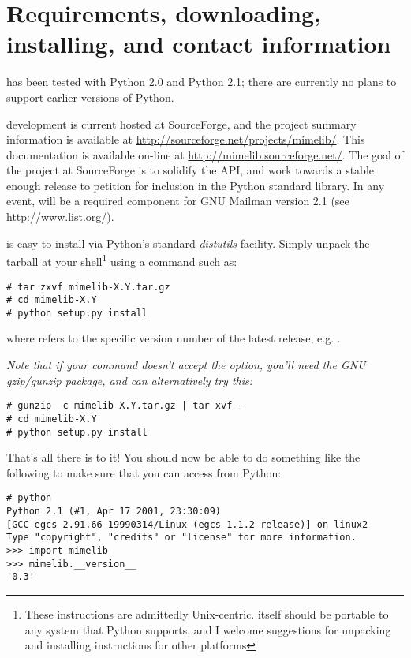 \documentclass{howto}
\begin{document}
\section{Requirements, downloading, installing, and contact information}

 has been tested with Python 2.0 and Python 2.1; there
are currently no plans to support earlier versions of Python.

 development is current hosted at SourceForge, and the
project summary information is available at
\url{http://sourceforge.net/projects/mimelib/}.  This documentation is
available on-line at \url{http://mimelib.sourceforge.net/}.  The goal
of the  project at SourceForge is to solidify the API,
and work towards a stable enough release to petition for inclusion in
the Python standard library.  In any event,  will be a
required component for GNU Mailman version 2.1 (see
\url{http://www.list.org/}).

 is easy to install via Python's standard
\emph{distutils} facility.  Simply unpack the tarball at your
shell\footnote{These instructions are admittedly Unix-centric.
 itself should be portable to any system that Python
supports, and I welcome suggestions for unpacking and installing
instructions for other platforms}
using a command such as:

\begin{verbatim}
# tar zxvf mimelib-X.Y.tar.gz
# cd mimelib-X.Y
# python setup.py install
\end{verbatim}

where  refers to the specific version number of the latest
 release, e.g. .

\emph{Note that if your  command doesn't accept the 
option, you'll need the GNU gzip/gunzip package, and can alternatively
try this:}

\begin{verbatim}
# gunzip -c mimelib-X.Y.tar.gz | tar xvf -
# cd mimelib-X.Y
# python setup.py install
\end{verbatim}

That's all there is to it!  You should now be able to do something
like the following to make sure that you can access 
from Python:

\begin{verbatim}
# python
Python 2.1 (#1, Apr 17 2001, 23:30:09) 
[GCC egcs-2.91.66 19990314/Linux (egcs-1.1.2 release)] on linux2
Type "copyright", "credits" or "license" for more information.
>>> import mimelib
>>> mimelib.__version__
'0.3'
\end{verbatim}
\end{document}
